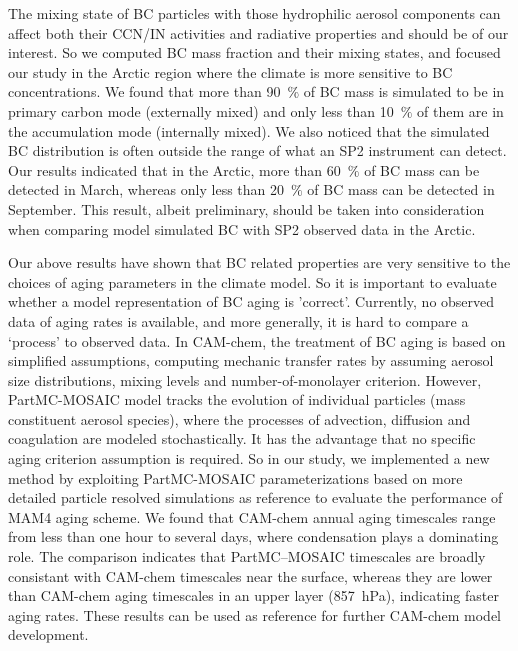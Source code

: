 \documentclass[12pt, fullpage]{uiucthesis2009}
\begin{document}
		The mixing state of BC particles with those hydrophilic aerosol components can affect both their CCN/IN activities and radiative properties and should be of our interest. So we computed BC mass fraction and their mixing states, and focused our study in the Arctic region where the climate is more sensitive to BC concentrations. We found that more than 90~$\%$ of BC mass is simulated to be in primary carbon mode (externally mixed) and only less than 10~$\%$ of them are in the accumulation mode (internally mixed). We also noticed that the simulated BC distribution is often outside the range of what an SP2 instrument can detect. Our results indicated that in the Arctic, more than 60~$\%$ of BC mass can be detected in March, whereas only less than 20~$\%$ of BC mass can be detected in September. This result, albeit preliminary, should be taken into consideration when comparing model simulated BC with SP2 observed data in the Arctic. 
 
		Our above results have shown that BC related properties are very sensitive to the choices of aging parameters in the climate model. So it is important to evaluate whether a model representation of BC aging is 'correct'. Currently, no observed data of aging rates is available, and more generally, it is hard to compare a ‘process’ to observed data. In CAM-chem, the treatment of BC aging is based on simplified assumptions, computing mechanic transfer rates by assuming aerosol size distributions, mixing levels and number-of-monolayer criterion. However, PartMC-MOSAIC model tracks the evolution of individual particles (mass constituent aerosol species), where the processes of advection, diffusion and coagulation are modeled stochastically. It has the advantage that no specific aging criterion assumption is required. So in our study, we implemented a new method by exploiting PartMC-MOSAIC parameterizations based on more detailed particle resolved simulations as reference to evaluate the performance of MAM4 aging scheme. We found that CAM-chem annual aging timescales range from less than one hour to several days, where condensation plays a dominating role. The comparison indicates that PartMC--MOSAIC timescales are broadly consistant with CAM-chem timescales near the surface, whereas they are lower than CAM-chem aging timescales in an upper layer (857~hPa), indicating faster aging rates. These results can be used as reference for further CAM-chem model development.
		
\end{document}

